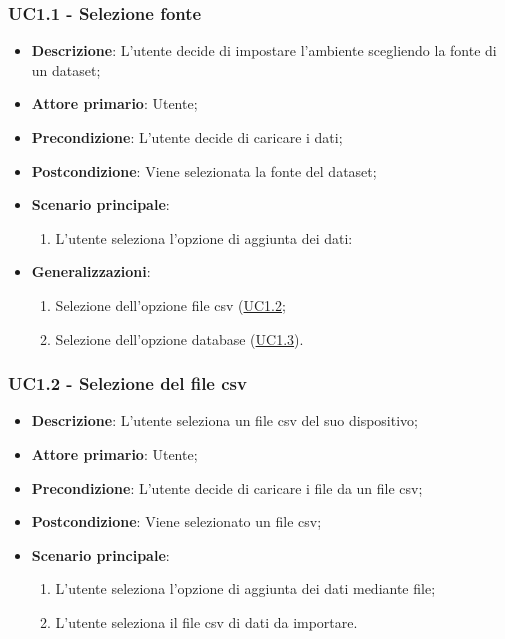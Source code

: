 \subsubsection{UC1.1 - Selezione fonte}
\label{ssub:uc1.1}
\begin{itemize}
    \item \textbf{Descrizione}: L'utente decide di impostare l'ambiente scegliendo la fonte di un dataset;

    \item \textbf{Attore primario}: Utente;
        
    \item \textbf{Precondizione}:   L'utente decide di caricare i dati;

    \item \textbf{Postcondizione}:  Viene selezionata la fonte del dataset;

	\item \textbf{Scenario principale}:
		\begin{enumerate}
			\item L'utente seleziona l'opzione di aggiunta dei dati:
        \end{enumerate}

        \item \textbf{Generalizzazioni}:
        \begin{enumerate}
            \item Selezione dell'opzione file csv (\hyperref[ssub:uc1.2]{UC1.2};
            \item Selezione dell'opzione database (\hyperref[ssub:uc1.3]{UC1.3}).
        \end{enumerate}
\end{itemize}


\subsubsection{UC1.2 - Selezione del file csv}
\label{ssub:uc1.2}
\begin{itemize}
    \item \textbf{Descrizione}: L'utente seleziona un file csv del suo dispositivo;

    \item \textbf{Attore primario}: Utente;
    
    \item \textbf{Precondizione}:   L'utente decide di caricare i file da un file csv;
    \item \textbf{Postcondizione}:  Viene selezionato un file csv;

	\item \textbf{Scenario principale}:
		\begin{enumerate}
			\item L'utente seleziona l'opzione di aggiunta dei dati mediante file;
			\item L'utente seleziona il file csv di dati da importare.
        \end{enumerate}
\end{itemize}

